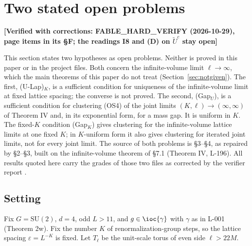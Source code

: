 %
\ifdefined\problem\else
\theoremstyle{definition}
\newtheorem{problem}[theorem]{Open problem}
\fi

\section{Two stated open problems}\label{sec:open}

\noindent\textbf{[Verified with corrections: FABLE\_HARD\_VERIFY (2026-10-29), page items in its \S F; the readings I8 and (D) on $\tilde U^c$ stay open]}

\medskip
This section states two hypotheses as open problems. Neither is proved in this paper or in the project files. Both concern the infinite-volume limit $\ell\to\infty$, which the main theorems of this paper do not treat (Section~\ref{sec:notgiven}). The first, (U-Lap)$_K$, is a sufficient condition for uniqueness of the infinite-volume limit at fixed lattice spacing; the converse is not proved. The second, (Gap$_U$), is a sufficient condition for clustering (OS4) of the joint limits $(K,\ell)\to(\infty,\infty)$ of Theorem IV and, in its exponential form, for a mass gap. It is uniform in $K$. The fixed-$K$ condition (Gap$_K$) gives clustering for the infinite-volume lattice limits at one fixed $K$; in $K$-uniform form it also gives clustering for iterated joint limits, not for every joint limit. The source of both problems is  \S3--\S4, as repaired by  \S2--\S3, built on the infinite-volume theorem of  \S7.1 (Theorem IV, L-196). All results quoted here carry the grades of those two files as corrected by the verifier report .

\subsection{Setting}\label{sec:open-setting}

Fix $G=\mathrm{SU}(2)$, $d=4$, odd $L>11$, and $g\in\ioc{\gamma}$ with $\gamma$ as in L-001 (Theorem 2w). Fix the number $K$ of renormalization-group steps, so the lattice spacing $\varepsilon=L^{-K}$ is fixed. Let $T_\ell$ be the unit-scale torus of even side $\ell>22M$.

